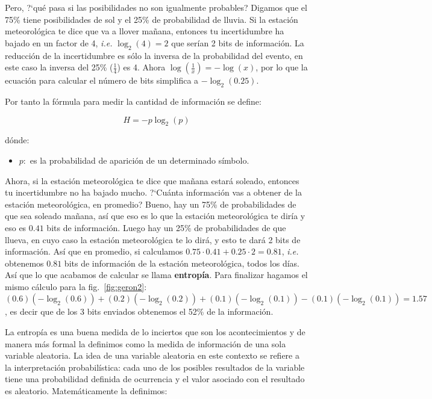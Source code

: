 \documentclass[a4paper,12pt]{article}
\begin{document}
Pero, ?`qué pasa si las posibilidades no son igualmente probables? Digamos que el 75\% tiene posibilidades de sol y el 25\% de probabilidad de lluvia. Si la estación meteorológica te dice que va a llover mañana, entonces tu incertidumbre ha bajado en un factor de 4, \textit{i.e.} $\log_2(4)=2$ que serían 2 bits de información. La reducción de la incertidumbre es sólo la inversa de la probabilidad del evento, en este caso la inversa del 25\% ($\frac{1}{4}$) es 4. Ahora $\log(\frac{1}{x})=-\log(x)$, por lo que la ecuación para calcular el número de bits simplifica a $-\log_2(0.25)$. 

%

Por tanto la fórmula para medir la cantidad de información se define:

$$ H = -p \log_2(p)$$

dónde:
\begin{itemize}[noitemsep, topsep=2pt]
	\item $p:$ es la probabilidad de aparición de un determinado símbolo.
\end{itemize}

Ahora, si la estación meteorológica te dice que mañana estará soleado, entonces tu incertidumbre no ha bajado mucho. ?`Cuánta información vas a obtener de la estación meteorológica, en promedio? Bueno, hay un 75\% de probabilidades de que sea soleado mañana, así que eso es lo que la estación meteorológica te diría y eso es $0.41$ bits de información. Luego hay un 25\% de probabilidades de que llueva, en cuyo caso la estación meteorológica te lo dirá, y esto te dará 2 bits de información. Así que en promedio, si calculamos $0.75\cdot 0.41 + 0.25 \cdot 2 = 0.81$, \textit{i.e.} obtenemos $0.81$ bits de información de la estación meteorológica, todos los días. Así que lo que acabamos de calcular se llama \textbf{entropía}. Para finalizar hagamos el mismo cálculo para la fig.~\ref{fig:geron2}: $(0.6)(-\log_2(0.6))+(0.2)(-\log_2(0.2))+(0.1)(-\log_2(0.1))-(0.1)(-\log_2(0.1))=1.57$, es decir que de los 3 bits enviados obtenemos el 52\% de la información. 

La entropía es una buena medida de lo inciertos que son los acontecimientos y de manera más formal la definimos como la medida de información de una sola variable aleatoria. La idea de una variable aleatoria en este contexto se refiere a la interpretación probabilística: cada uno de los posibles resultados de la variable tiene una probabilidad definida de ocurrencia y el valor asociado con el resultado es aleatorio. Matemáticamente la definimos:
\end{document}
